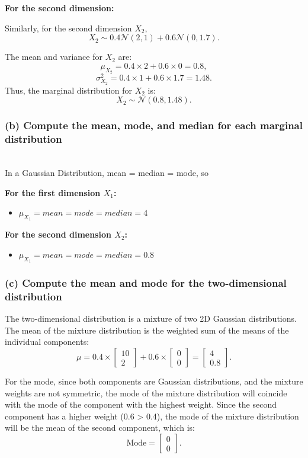 \documentclass[12pt]{article}
\begin{document}
\textbf{For the second dimension:}

Similarly, for the second dimension \( X_2 \),
\[
X_2 \sim 0.4\mathcal{N}(2, 1) + 0.6\mathcal{N}(0, 1.7).
\]

The mean and variance for \( X_2 \) are:
\[
\mu_{X_2} = 0.4 \times 2 + 0.6 \times 0 = 0.8,
\]
\[
\sigma^2_{X_2} = 0.4 \times 1 + 0.6 \times 1.7 = 1.48.
\]
Thus, the marginal distribution for \( X_2 \) is:
\[
X_2 \sim \mathcal{N}(0.8, 1.48).
\]

\subsubsection*{(b) Compute the mean, mode, and median for each marginal distribution}
\\ In a Gaussian Distribution, mean = median = mode, so

\textbf{For the first dimension \( X_1 \):}

\begin{itemize}
    \item \( \mu_{X_1} = mean = mode = median = 4\)
\end{itemize}

\textbf{For the second dimension \( X_2 \):}
\begin{itemize}
    \item \( \mu_{X_1} = mean = mode = median = 0.8\)
\end{itemize}

\subsubsection*{(c) Compute the mean and mode for the two-dimensional distribution}

The two-dimensional distribution is a mixture of two 2D Gaussian distributions. The mean of the mixture distribution is the weighted sum of the means of the individual components:
\[
\mu = 0.4 \times \begin{bmatrix} 10 \\ 2 \end{bmatrix} + 0.6 \times \begin{bmatrix} 0 \\ 0 \end{bmatrix} = \begin{bmatrix} 4 \\ 0.8 \end{bmatrix}.
\]

For the mode, since both components are Gaussian distributions, and the mixture weights are not symmetric, the mode of the mixture distribution will coincide with the mode of the component with the highest weight. Since the second component has a higher weight (0.6 > 0.4), the mode of the mixture distribution will be the mean of the second component, which is:
\[
\text{Mode} = \begin{bmatrix} 0 \\ 0 \end{bmatrix}.
\]
\end{document}
